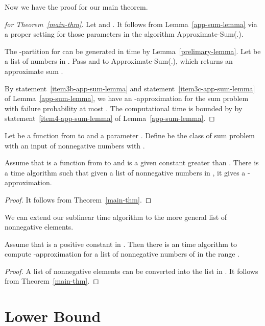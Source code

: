 \documentclass[runningheads]{llncs}
\begin{document}
Now we have the proof for our main theorem.

\begin{proof}[for Theorem~\ref{main-thm}]
Let  and .  It follows from
Lemma~\ref{app-sum-lemma} via a proper setting for those parameters
in the algorithm Approximate-Sum(.).

 The -partition   for  can be generated in  time by Lemma~\ref{prelimary-lemma}.
Let  be a list of  numbers in . Pass  and  to Approximate-Sum(.), which returns an approximate
sum .

 By statement~\ref{item3b-app-sum-lemma} and
statement~\ref{item3c-app-sum-lemma} of Lemma~\ref{app-sum-lemma},
we have an -approximation for the sum problem with
failure probability at most . The computational time is
bounded by  by
statement~\ref{item4-app-sum-lemma} of  Lemma~\ref{app-sum-lemma}.
\end{proof}


\begin{definition} Let  be a function from  to  and a parameter .
Define  be the class of sum problem with an input of
nonnegative numbers  with .
\end{definition}

\begin{corollary} Assume that  is a function from  to  and  is a given constant  greater than .
There is a  time algorithm such that
given  a list of nonnegative numbers  in
, it gives a -approximation.
\end{corollary}

\begin{proof}
It follows from Theorem~\ref{main-thm}.
\end{proof}



We can extend our sublinear time algorithm to the more general list
of nonnegative elements.

\begin{theorem}
Assume that  is a positive constant in . Then there
is an  time algorithm to
compute -approximation for a list of nonnegative
numbers  of in the range .
\end{theorem}


\begin{proof}
A list of nonnegative elements  can be converted
into the list  in . It
follows from Theorem~\ref{main-thm}.
\end{proof}

\section{Lower Bound }
\end{document}
